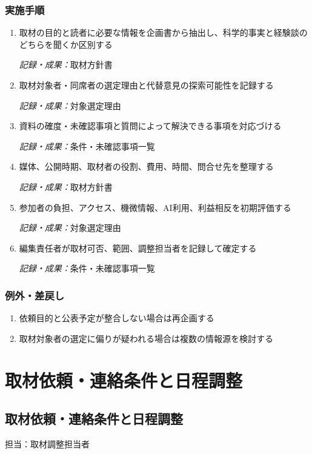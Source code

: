 \documentclass[a4paper,11pt]{article}
\begin{document}
\subsubsection*{実施手順}
\begin{enumerate}[leftmargin=2em,itemsep=0.65em]
\item 取材の目的と読者に必要な情報を企画書から抽出し、科学的事実と経験談のどちらを聞くか区別する\par\noindent\textit{記録・成果：}取材方針書\nobreak\smallskip
\item 取材対象者・同席者の選定理由と代替意見の探索可能性を記録する\par\noindent\textit{記録・成果：}対象選定理由\nobreak\smallskip
\item 資料の確度・未確認事項と質問によって解決できる事項を対応づける\par\noindent\textit{記録・成果：}条件・未確認事項一覧\nobreak\smallskip
\item 媒体、公開時期、取材者の役割、費用、時間、問合せ先を整理する\par\noindent\textit{記録・成果：}取材方針書\nobreak\smallskip
\item 参加者の負担、アクセス、機微情報、AI利用、利益相反を初期評価する\par\noindent\textit{記録・成果：}対象選定理由\nobreak\smallskip
\item 編集責任者が取材可否、範囲、調整担当者を記録して確定する\par\noindent\textit{記録・成果：}条件・未確認事項一覧\nobreak\smallskip
\end{enumerate}
\subsubsection*{例外・差戻し}
\begin{enumerate}[leftmargin=2em,itemsep=0.35em]
\item 依頼目的と公表予定が整合しない場合は再企画する
\item 取材対象者の選定に偏りが疑われる場合は複数の情報源を検討する
\end{enumerate}
\section{取材依頼・連絡条件と日程調整}
\subsection{取材依頼・連絡条件と日程調整}
\par 担当：取材調整担当者\par\medskip
\end{document}
